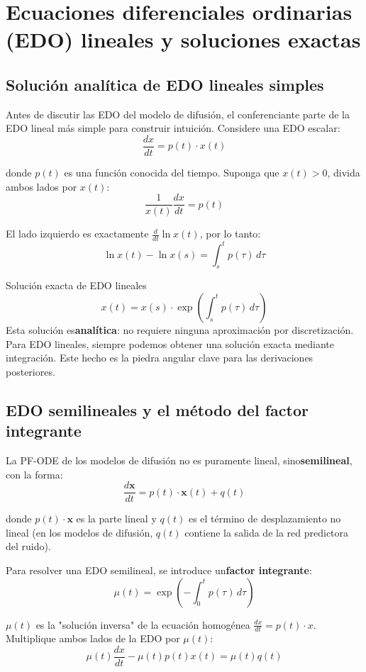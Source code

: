 \section{Ecuaciones diferenciales ordinarias (EDO) lineales y soluciones exactas}

\subsection{Solución analítica de EDO lineales simples}

Antes de discutir las EDO del modelo de difusión, el conferenciante parte de la EDO lineal más simple para construir intuición. Considere una EDO escalar:
$$\frac{dx}{dt} = p(t) \cdot x(t)$$

donde $p(t)$ es una función conocida del tiempo. Suponga que $x(t) > 0$, divida ambos lados por $x(t)$:
$$\frac{1}{x(t)} \frac{dx}{dt} = p(t)$$

El lado izquierdo es exactamente $\frac{d}{dt} \ln x(t)$, por lo tanto:
$$\ln x(t) - \ln x(s) = \int_s^t p(\tau)\, d\tau$$

\begin{importantbox}{Solución exacta de EDO lineales}
$$x(t) = x(s) \cdot \exp\left(\int_s^t p(\tau)\, d\tau\right)$$
Esta solución es\textbf{analítica}: no requiere ninguna aproximación por discretización. Para EDO lineales, siempre podemos obtener una solución exacta mediante integración. Este hecho es la piedra angular clave para las derivaciones posteriores.
\end{importantbox}

\subsection{EDO semilineales y el método del factor integrante}

La PF-ODE de los modelos de difusión no es puramente lineal, sino\textbf{semilineal}, con la forma:
$$\frac{d\mathbf{x}}{dt} = p(t) \cdot \mathbf{x}(t) + q(t)$$

donde $p(t) \cdot \mathbf{x}$ es la parte lineal y $q(t)$ es el término de desplazamiento no lineal (en los modelos de difusión, $q(t)$ contiene la salida de la red predictora del ruido).

Para resolver una EDO semilineal, se introduce un\textbf{factor integrante}:
$$\mu(t) = \exp\left(-\int_0^t p(\tau)\, d\tau\right)$$

$\mu(t)$ es la "solución inversa" de la ecuación homogénea $\frac{dx}{dt} = p(t) \cdot x$. Multiplique ambos lados de la EDO por $\mu(t)$:
$$\mu(t) \frac{dx}{dt} - \mu(t) p(t) x(t) = \mu(t) q(t)$$

